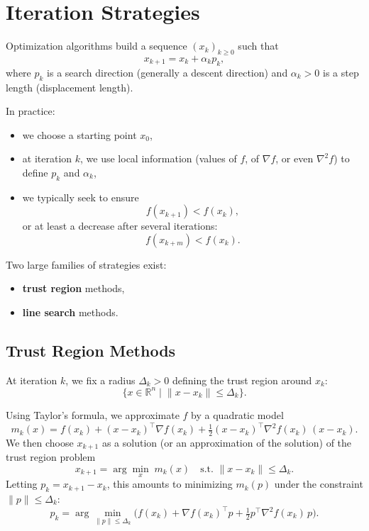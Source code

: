 \section{Iteration Strategies}
\label{sec:2.3}

Optimization algorithms build a sequence $(x_k)_{k\ge 0}$ such that
\[
    x_{k+1} = x_k + \alpha_k p_k,
\]
where $p_k$ is a search direction (generally a descent direction) and $\alpha_k > 0$
is a step length (displacement length).

In practice:
\begin{itemize}
    \item we choose a starting point $x_0$,
    \item at iteration $k$, we use local information (values of $f$, of
    $\nabla f$, or even $\nabla^2 f$) to define $p_k$ and $\alpha_k$,
    \item we typically seek to ensure
    \[
        f(x_{k+1}) < f(x_k),
    \]
    or at least a decrease after several iterations:
    \[
        f(x_{k+m}) < f(x_k).
    \]
\end{itemize}

Two large families of strategies exist:
\begin{itemize}
    \item \textbf{trust region} methods,
    \item \textbf{line search} methods.
\end{itemize}

\subsection{Trust Region Methods}
\label{subsec:2.3.1}

At iteration $k$, we fix a radius $\Delta_k > 0$ defining the trust region
around $x_k$:
\[
    \{x \in \mathbb{R}^n \;|\; \|x - x_k\| \le \Delta_k\}.
\]

Using Taylor's formula, we approximate $f$ by a quadratic model
\begin{equation}
    m_k(x) = f(x_k) + (x-x_k)^\top \nabla f(x_k)
             + \tfrac{1}{2}(x-x_k)^\top \nabla^2 f(x_k)\,(x-x_k).
\end{equation}
We then choose $x_{k+1}$ as a solution (or an approximation of the solution)
of the trust region problem
\begin{equation}
    x_{k+1} = \arg\min_{x} \; m_k(x)
    \quad \text{s.t. } \|x - x_k\| \le \Delta_k.
\end{equation}
Letting $p_k = x_{k+1} - x_k$, this amounts to minimizing $m_k(p)$ under the
constraint $\|p\| \le \Delta_k$:
\begin{equation}
    p_k = \arg\min_{\|p\| \le \Delta_k}
    \Big( f(x_k) + \nabla f(x_k)^\top p
          + \tfrac{1}{2}p^\top \nabla^2 f(x_k)\,p \Big).
\end{equation}

